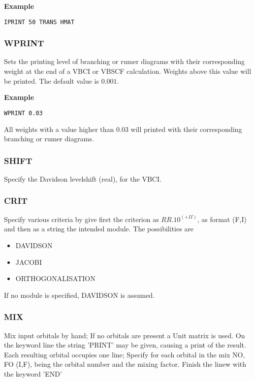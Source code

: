 \documentclass[11pt,fleqn]{article}
\begin{document}
{\bf Example}
\begin{verbatim}
IPRINT 50 TRANS HMAT
\end{verbatim}

\subsubsection{WPRINT}
Sets the printing level of branching or rumer diagrams with their
corresponding weight at the end of a VBCI or VBSCF calculation. Weights
above this value will be printed. The default value is $0.001$.

{\bf Example}
\begin{verbatim}
WPRINT 0.03
\end{verbatim}

All weights with a value higher than 0.03 will printed with their corresponding branching or rumer diagrams.

\subsubsection{SHIFT}

Specify the Davidson levelshift (real), for the VBCI. 

\subsubsection{CRIT}

Specify various criteria by give first the criterion as $RR.10^{(+II)}$, as
format (F,I) and then as a string the intended module. The possibilities are


\begin{itemize}
\item DAVIDSON
\item JACOBI
\item ORTHOGONALISATION
\end{itemize}

If no module is specified, DAVIDSON is assumed.

\subsubsection{MIX}

Mix input orbitals by hand; If no orbitals are present a Unit matrix is used.
On the keyword line the string 'PRINT' may be given, causing a print of the result.
Each resulting orbital occupies one line; Specify for each orbital in the mix
NO, FO (I,F), being the orbital number and the mixing factor.
Finish the linew with the keyword 'END'
\end{document}
